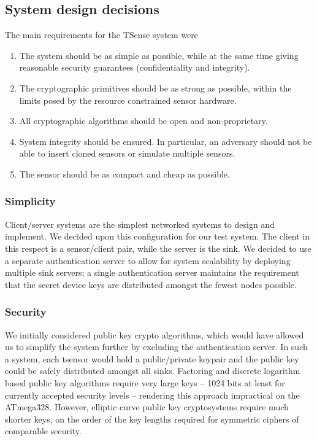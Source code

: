 \subsection{System design decisions}

The main requirements for the TSense system were
%
\begin{enumerate}
\item The system should be as simple as possible, while at the same time giving reasonable security guarantees (confidentiality and integrity).
\item The cryptographic primitives should be as strong as possible, within the limits posed by the resource constrained sensor hardware.
\item All cryptographic algorithms should be open and non-proprietary.
\item System integrity should be ensured. In particular, an adversary should not be able to insert cloned sensors or simulate multiple sensors. 
\item The sensor should be as compact and cheap as possible.
\end{enumerate}

\subsubsection{Simplicity}

Client/server systems are the simplest networked systems to design and implement. We decided upon this configuration for our test system. The client in this respect is a sensor/client pair, while the server is the sink. We decided to use a separate authentication server to allow for system scalability by deploying multiple sink servers; a single authentication server maintains the requirement that the secret device keys are distributed amongst the fewest nodes possible.

\subsubsection{Security}

We initially considered public key crypto algorithms, which would have allowed us to simplify the system further by excluding the authentication server. In such a system, each tsensor would hold a public/private keypair and the public key could be safely distributed amongst all sinks. Factoring and discrete logarithm based public key algorithms require very large keys -- 1024 bits at least for currently accepted security levels -- rendering this approach impractical on the ATmega328. 
%
%
However, elliptic curve public key cryptosystems \cite{koblitz1987,hankerson2004} require much shorter keys, on the order of the key lengths required for symmetric ciphers of comparable security.
%

